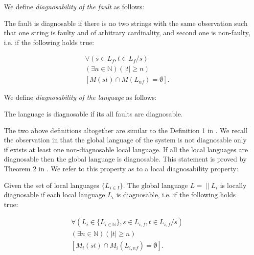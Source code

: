 \documentclass[a4paper, 10pt, conference]{ieeeconf} \IEEEoverridecommandlockouts
\begin{document}


We define \emph{diagnosability of the fault} as follows:
\begin{definition} The fault is diagnosable if there is no two strings
with the same observation such that one string is faulty and of arbitrary
cardinality, and second one is non-faulty, i.e. if the following holds true:
\end{definition}
\begin{equation}
\begin{array}{l}
	\forall(s \in L_f, t \in L_f/s) 
	\\
	(\exists n \in \mathbb{N})
	(|t| \geq n) 
	\\
	\left[ M(st) \cap M(L_{nf}) = \emptyset \right].
\end{array}
\end{equation}

We define \emph{diagnosability of the language} as follows:
\begin{definition}
The language is diagnosable if its all faults are diagnosable.
\end{definition}
The two above definitions altogether are similar to the Definition 1 in
\cite{sampath_diagnosability_1995}. We recall the observation in
\cite{contant_diagnosability_2006} that the global language of the system is not
diagnosable only if exists at least one non-diagnosable local language.
If all the local languages are diagnosable then the global language is
diagnosable. This statement is proved by Theorem 2 in
\cite{contant_diagnosability_2006}. We refer to this property as to a local
diagnosability property:

\begin{definition} Given the set of local languages
$\{L_{i \in I}\}$. The global language $L = \parallel L_i$ is
locally diagnosable if each local language $L_i$ is diagnosable, i.e. if
the following holds true:
\end{definition}
\begin{equation}
\begin{array}{l}
	\forall(L_i \in \{L_{i \in \mathbb{N}}\}, s \in L_{i,f}, t \in L_{i,f}/s)
	\\
	(\exists n \in \mathbb{N})
	(|t| \geq n)
	\\
	\left[ M_i(st) \cap M_i(L_{i,nf}) = \emptyset \right].
\end{array}
\end{equation}
\end{document}
